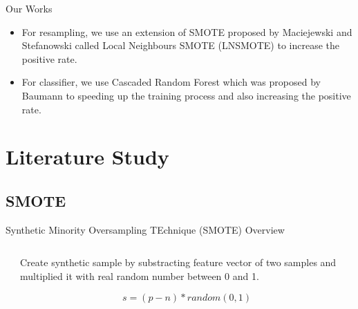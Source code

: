 \documentclass{beamer}
\begin{document}
\begin{frame}{Our Works}
	\begin{itemize}
		\item For resampling, we use an extension of SMOTE proposed by
		Maciejewski and Stefanowski called Local Neighbours SMOTE (LNSMOTE)
		to increase the positive rate.
		\item For classifier, we use Cascaded Random Forest which was
		proposed by Baumann to speeding up the training process and also
		increasing the positive rate.
	\end{itemize}
\end{frame}

\section{Literature Study}

\begin{frame}
	\begin{multicols}{2}
		\tableofcontents[currentsection]
	\end{multicols}
\end{frame}

\subsection{SMOTE}

\begin{frame}{Synthetic Minority Oversampling TEchnique (SMOTE)}
	{Overview}
	\begin{columns}
		\begin{column}{0.5\textwidth}
		\end{column}

		\begin{column}{0.5\textwidth}
			Create synthetic sample by substracting feature vector of two
			samples and multiplied it with real random number between 0 and
			1.

			\[
				s = (p - n) * random(0,1)
			\]
		\end{column}
	\end{columns}
\end{frame}
\end{document}
